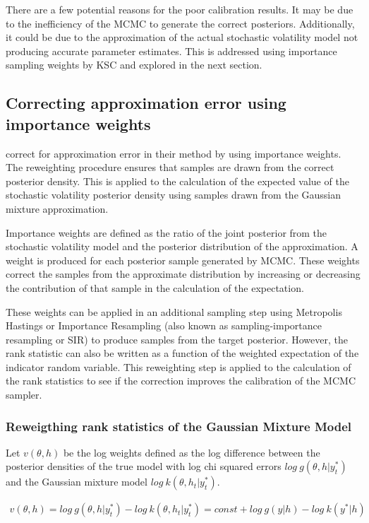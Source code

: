 \documentclass[12pt, a4paper]{article}
\begin{document}
    There are a few potential reasons for the poor calibration results. It may be due to the inefficiency of the MCMC to generate the correct posteriors. Additionally, it could be due to the approximation of the actual stochastic volatility model not producing accurate parameter estimates. This is addressed using importance sampling weights by KSC and explored in the next section.  

    \subsection{Correcting approximation error using importance weights}
    \citet{kim1998stochastic} correct for approximation error in their method by using importance weights. The reweighting procedure ensures that samples are drawn from the correct posterior density. This is applied to the calculation of the expected value of the stochastic volatility posterior density using samples drawn from the Gaussian mixture approximation. 

    Importance weights are defined as the ratio of the joint posterior from the stochastic volatility model and the posterior distribution of the approximation. A weight is produced for each posterior sample generated by MCMC. These weights correct the samples from the approximate distribution by increasing or decreasing the contribution of that sample in the calculation of the expectation. 

    These weights can be applied in an additional sampling step using Metropolis Hastings or Importance Resampling (also known as sampling-importance resampling or SIR) to produce samples from the target posterior. However, the rank statistic can also be written as a function of the weighted expectation of the indicator random variable. This reweighting step is applied to the calculation of the rank statistics to see if the correction improves the calibration of the MCMC sampler.

    \subsubsection{Reweigthing rank statistics of the Gaussian Mixture Model}
    Let $v(\theta, h)$ be the log weights defined as the log difference between the posterior densities of the true model with log chi squared errors $log\: g(\theta, h | y^{\ast}_t)$ and the Gaussian mixture model $log\:  k(\theta, h_t | y^{\ast}_t)$.

    $$
    \begin{aligned}
        v(\theta, h) = log\: g(\theta, h | y^{\ast}_t) - log\:  k(\theta, h_t | y^{\ast}_t) = const + log\: g(y|h) - log\: k(y^{\ast} | h)
    \end{aligned}
    $$
\end{document}
